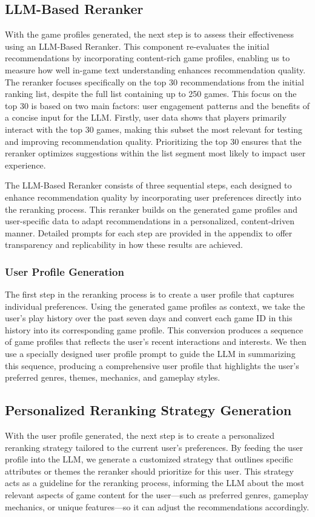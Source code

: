 \subsection{LLM-Based Reranker}
With the game profiles generated, the next step is to assess their effectiveness using an LLM-Based Reranker. This component re-evaluates the initial recommendations by incorporating content-rich game profiles, enabling us to measure how well in-game text understanding enhances recommendation quality. The reranker focuses specifically on the top 30 recommendations from the initial ranking list, despite the full list containing up to 250 games. This focus on the top 30 is based on two main factors: user engagement patterns and the benefits of a concise input for the LLM. Firstly, user data shows that players primarily interact with the top 30 games, making this subset the most relevant for testing and improving recommendation quality. Prioritizing the top 30 ensures that the reranker optimizes suggestions within the list segment most likely to impact user experience.

The LLM-Based Reranker consists of three sequential steps, each designed to enhance recommendation quality by incorporating user preferences directly into the reranking process. This reranker builds on the generated game profiles and user-specific data to adapt recommendations in a personalized, content-driven manner. Detailed prompts for each step are provided in the appendix to offer transparency and replicability in how these results are achieved.

\subsubsection{User Profile Generation}
The first step in the reranking process is to create a user profile that captures individual preferences. Using the generated game profiles as context, we take the user’s play history over the past seven days and convert each game ID in this history into its corresponding game profile. This conversion produces a sequence of game profiles that reflects the user’s recent interactions and interests. We then use a specially designed user profile prompt to guide the LLM in summarizing this sequence, producing a comprehensive user profile that highlights the user’s preferred genres, themes, mechanics, and gameplay styles.

\subsection{Personalized Reranking Strategy Generation}
With the user profile generated, the next step is to create a personalized reranking strategy tailored to the current user’s preferences. By feeding the user profile into the LLM, we generate a customized strategy that outlines specific attributes or themes the reranker should prioritize for this user. This strategy acts as a guideline for the reranking process, informing the LLM about the most relevant aspects of game content for the user—such as preferred genres, gameplay mechanics, or unique features—so it can adjust the recommendations accordingly.

